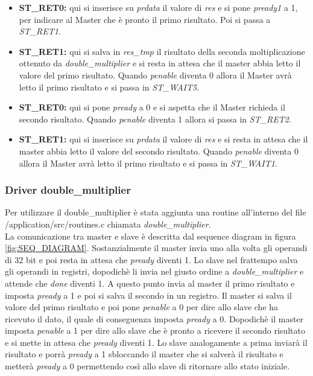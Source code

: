 \documentclass[]{IEEEtran}
\begin{document}
\begin{itemize}
    \item \textbf{ST\_RET0:} qui si inserisce su \textit{prdata} il valore di \textit{res} e si pone \textit{pready1} a 1, per indicare al Master che è pronto il primo risultato. Poi si passa a \textit{ST\_RET1}.
    \item \textbf{ST\_RET1:} qui si salva in \textit{res\_tmp} il risultato della seconda moltiplicazione ottenuto da \textit{double\_multiplier} e si resta in attesa che il master abbia letto il valore del primo risultato. Quando \textit{penable} diventa 0 allora il Master avrà letto il primo risultato e si passa in \textit{ST\_WAIT5}.
    \item \textbf{ST\_RET0:} qui si pone \textit{pready} a 0 e si aspetta che il Master richieda il secondo risultato. Quando \textit{penable} diventa 1 allora si passa in \textit{ST\_RET2}.
    \item \textbf{ST\_RET1:} qui si inserisce su \textit{prdata} il valore di \textit{res} e si resta in attesa che il master abbia letto il valore del secondo risultato. Quando \textit{penable} diventa 0 allora il Master avrà letto il primo risultato e si passa in \textit{ST\_WAIT1}.
\end{itemize}

\subsubsection{Driver double\_multiplier}
Per utilizzare il double\_multiplier è stata aggiunta una routine all'interno del file /application/src/routines.c chiamata \textit{double\_multiplier}.
\\La comunicazione tra master e slave è descritta dal sequence diagram in figura \ref{fig:SEQ_DIAGRAM}. Sostanzialmente il master invia uno alla volta gli operandi di 32 bit e poi resta in attesa che \textit{pready} diventi 1. Lo slave nel frattempo salva gli operandi in registri, dopodichè li invia nel giusto ordine a \textit{double\_multiplier} e attende che \textit{done} diventi 1. A questo punto invia al master il primo risultato e imposta \textit{pready} a 1 e poi si salva il secondo in un registro. Il master si salva il valore del primo risultato e poi pone \textit{penable} a 0 per dire allo slave che ha ricevuto il dato, il quale di conseguenza imposta \textit{pready} a 0. Dopodichè il master imposta \textit{penable} a 1 per dire allo slave che è pronto a ricevere il secondo risultato e si mette in attesa che \textit{pready} diventi 1. Lo slave analogamente a prima inviarà il risultato e porrà \textit{pready} a 1 sbloccando il master che si salverà il risultato e metterà \textit{pready} a 0 permettendo così allo slave di ritornare allo stato iniziale.
\end{document}
